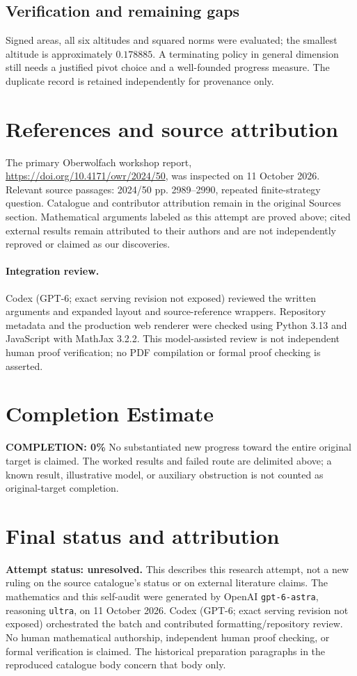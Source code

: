 \documentclass[11pt]{article}
\begin{document}
\subsection{Verification and remaining gaps}
Signed areas, all six altitudes and squared norms were evaluated; the smallest altitude is approximately $0.178885$. A terminating policy in general dimension still needs a justified pivot choice and a well-founded progress measure. The duplicate record is retained independently for provenance only.

\section{References and source attribution}
The primary Oberwolfach workshop report, \url{https://doi.org/10.4171/owr/2024/50}, was inspected on 11 October 2026. Relevant source passages: 2024/50 pp. 2989--2990, repeated finite-strategy question. Catalogue and contributor attribution remain in the original Sources section. Mathematical arguments labeled as this attempt are proved above; cited external results remain attributed to their authors and are not independently reproved or claimed as our discoveries.


\paragraph{Integration review.} Codex (GPT-6; exact serving revision not exposed) reviewed the written arguments and expanded layout and source-reference wrappers. Repository metadata and the production web renderer were checked using Python 3.13 and JavaScript with MathJax 3.2.2. This model-assisted review is not independent human proof verification; no PDF compilation or formal proof checking is asserted.

\section{Completion Estimate}
\noindent\textbf{COMPLETION: 0\%}
No substantiated new progress toward the entire original target is claimed. The worked results and failed route are delimited above; a known result, illustrative model, or auxiliary obstruction is not counted as original-target completion.

\section{Final status and attribution}
\textbf{Attempt status: unresolved.} This describes this research attempt, not a new ruling on the source catalogue's status or on external literature claims.
The mathematics and this self-audit were generated by OpenAI \texttt{gpt-6-astra}, reasoning \texttt{ultra}, on 11 October 2026. Codex (GPT-6; exact serving revision not exposed) orchestrated the batch and contributed formatting/repository review. No human mathematical authorship, independent human proof checking, or formal verification is claimed. The historical preparation paragraphs in the reproduced catalogue body concern that body only.
\end{document}
